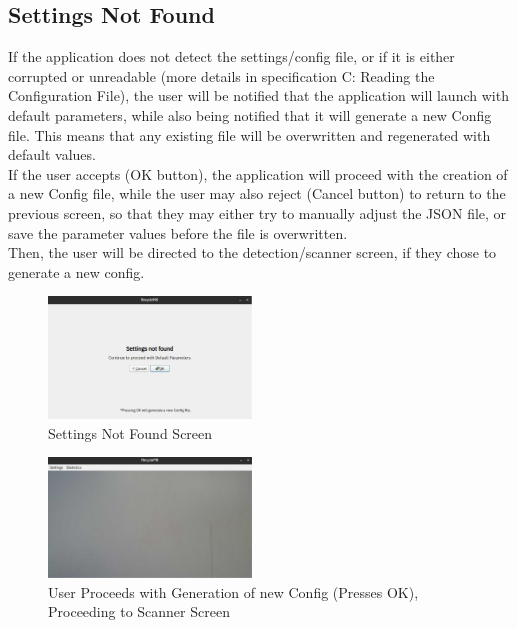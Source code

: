 \documentclass[conference]{IEEEtran}
\begin{document}
\subsection{Settings Not Found}
If the application does not detect the settings/config file, or if it is either corrupted or unreadable (more details in specification C: Reading the Configuration File), the user will be notified that the application will launch with default parameters, while also being notified that it will generate a new Config file. This means that any existing file will be overwritten and regenerated with default values.~\\

If the user accepts (OK button), the application will proceed with the creation of a new Config file, while the user may also reject (Cancel button) to return to the previous screen, so that they may either try to manually adjust the JSON file, or save the parameter values before the file is overwritten.~\\

Then, the user will be directed to the detection/scanner screen, if they chose to generate a new config. 

\begin{figure}[!h]
    \centering
    \includegraphics[width=0.48\textwidth]{images/settings_alert.eps}
    \caption{Settings Not Found Screen}
\end{figure}

\begin{figure}[!h]
    \centering
    \includegraphics[width=0.48\textwidth]{images/nothing_detected.eps}
    \caption{User Proceeds with Generation of new Config (Presses OK), Proceeding to Scanner Screen}
\end{figure}
\end{document}
